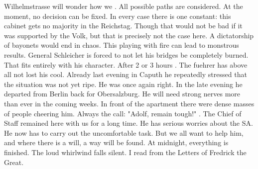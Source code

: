 Wilhelmstrasse will wonder how we . All possible paths are considered. At the moment, no decision can be fixed. In every case there is one constant: this cabinet gets no majority in the Reichstag. Though that would not be bad if it was supported by the Volk, but that is precisely not the case here. A dictatorship of bayonets would end in chaos. This playing with fire can lead to monstrous results. General Schleicher is forced to not let his bridges be completely burned. That fits entirely with his character. After 2 or 3 hours . The fuehrer has above all not lost his cool. Already last evening in Caputh he repeatedly stressed that the situation was not yet ripe. He was once again right. In the late evening he departed from Berlin back for Obersalzburg. He will need strong nerves more than ever in the coming weeks. In front of the apartment there were dense masses of people cheering him. Always the call: "Adolf, remain tough!" . The Chief of Staff remained here with us for a long time. He has serious worries about the SA. He now has to carry out the uncomfortable task. But we all want to help him, and where there is a will, a way will be found. At midnight, everything is finished. The loud whirlwind falls silent. I read from the Letters of Fredrick the Great.
